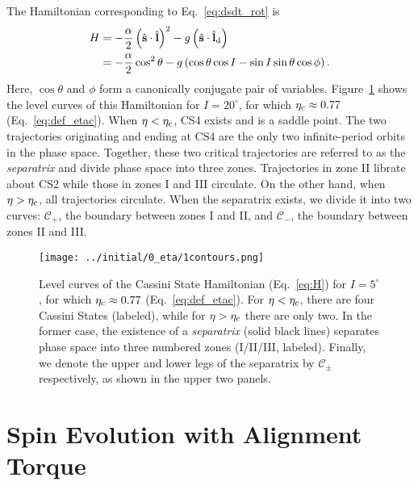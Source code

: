 \documentclass[
        fleqn,
        usenatbib,
    ]{mnras}
\newcommand*{\p}[1]{\left(#1\right)}
\newcommand*{\uv}[1]{\hat{\mathbf{#1}}}
\begin{document}
The Hamiltonian corresponding to Eq.~\eqref{eq:dsdt_rot} is
\begin{align}
    H &= -\frac{\alpha}{2}\p{\uv{s} \cdot \uv{l}}^2
            - g\p{\uv{s} \cdot \uv{l}_{\rm d}}\nonumber\\
        &= -\frac{\alpha}{2} \cos^2\theta
            - g\p{\cos\theta \cos I - \sin I \sin\theta \cos \phi}.\label{eq:H}
\end{align}
Here, $\cos \theta$ and $\phi$ form a canonically conjugate pair of variables.
Figure~\ref{fig:1contours} shows the level curves of this Hamiltonian for $I =
20^\circ$, for which $\eta_{\rm c} \approx 0.77$ (Eq.~\ref{eq:def_etac}). When $\eta
< \eta_{\rm c}$, CS4 exists and is a saddle point. The two trajectories
originating and ending at CS4 are the only two infinite-period orbits in the
phase space. Together, these two critical trajectories are referred to as the
\emph{separatrix} and divide phase space into three zones. Trajectories in zone
II librate about CS2 while those in zones I and III circulate. On the other
hand, when $\eta > \eta_{\rm c}$, all trajectories circulate. When the
separatrix exists, we divide it into two curves: $\mathcal{C}_+$, the boundary
between zones I and II, and $\mathcal{C}_-$, the boundary between zones II and
III\@.
\begin{figure}
    \centering
    \texttt{[image: ../initial/0\_eta/1contours.png]}
    \caption{Level curves of the Cassini State Hamiltonian (Eq.~\ref{eq:H}) for
    $I = 5^\circ$, for which $\eta_{\rm c} \approx 0.77$ (Eq.~\ref{eq:def_etac}).
    For $\eta < \eta_{\rm c}$, there are four Cassini States (labeled), while
    for $\eta > \eta_{\rm c}$ there are only two. In the former case, the
    existence of a \emph{separatrix} (solid black lines) separates phase space
    into three numbered zones (I/II/III, labeled). Finally, we denote the upper
    and lower legs of the separatrix by $\mathcal{C}_{\pm}$ respectively, as
    shown in the upper two panels.}\label{fig:1contours}
\end{figure}

\section{Spin Evolution with Alignment Torque}\label{s:toy_model}
\end{document}
